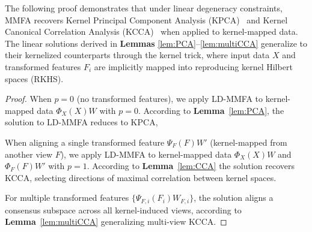 \documentclass{article}
\begin{document}
The following proof demonstrates that under linear degeneracy constraints, MMFA recovers Kernel Principal Component Analysis (KPCA)~\cite{kpca} and Kernel Canonical Correlation Analysis (KCCA)~\cite{fukumizu2007statistical} when applied to kernel-mapped data. The linear solutions derived in \textbf{Lemmas} \ref{lem:PCA}–\ref{lem:multiCCA} generalize to their kernelized counterparts through the kernel trick, where input data \(X\) and transformed features \(F_i\) are implicitly mapped into reproducing kernel Hilbert spaces (RKHS).


\begin{proof}
When \(p = 0\) (no transformed features), we apply LD-MMFA to kernel-mapped data \(\Phi_X(X)W\) with \(p = 0\). According to \textbf{Lemma}~\ref{lem:PCA}, the solution to LD-MMFA reduces to KPCA,

When aligning a single transformed feature \(\Psi_F(F)W'\) (kernel-mapped from another view \(F\)), we apply LD-MMFA to kernel-mapped data \(\Phi_X(X)W\) and \(\Phi_F(F)W'\) with \(p = 1\). According to \textbf{Lemma}~\ref{lem:CCA} the solution recovers KCCA, selecting directions of maximal correlation between kernel spaces.

For multiple transformed features \(\{\Psi_{F,i}(F_i)W_{F,i}\}\), the solution aligns a consensus subspace across all kernel-induced views, according to \textbf{Lemma}~\ref{lem:multiCCA} generalizing multi-view KCCA.
\end{proof}

\end{document}
